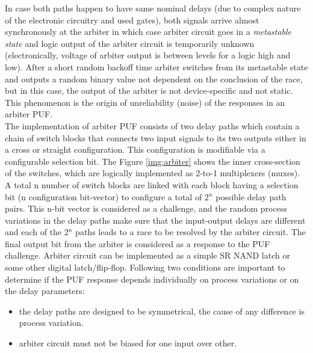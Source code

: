 In case both paths happen to have same nominal delays (due to complex nature of the electronic circuitry and used gates), both signals arrive almost synchronously at the arbiter in which case arbiter circuit goes in a \emph{metastable state} and logic output of the arbiter circuit is temporarily unknown (electronically, voltage of arbiter output is between levels for a logic high and low). After a short random backoff time arbiter switches from its metastable state and outputs a random binary
value not dependent on the conclusion of the race, but in this case, the output of the arbiter is not device-specific and not static. This phenomenon is the origin of unreliability (noise) of the responses in an arbiter PUF.\\

The implementation of arbiter PUF consists of two delay paths which contain a chain of switch blocks that connects two input signals to its two outputs either in a cross or straight configuration. This configuration is modifiable via a configurable selection bit. The Figure \ref{img:arbiter} shows the inner cross-section of the switches, which are logically implemented as 2-to-1 multiplexers (muxes). A total n number of switch blocks are linked with each block having a selection bit (n configuration bit-vector) to
configure a total of 2$^n$ possible delay path pairs. This n-bit vector is considered as a challenge, and the random process variations in the delay paths make sure that the input-output delays are different and each of the 2$^n$ paths leads to a race to be resolved by the arbiter circuit. The final output bit from the arbiter is considered as a response to the PUF challenge. Arbiter circuit can be implemented as a simple SR NAND latch or some other digital latch/flip-flop. Following two conditions are
important to determine if the PUF response depends individually on process variations or on the delay parameters:
\begin{itemize}
	\item the delay paths are designed to be symmetrical, the cause of any difference is process variation.
	\item arbiter circuit must not be biased for one input over other.
\end{itemize}

